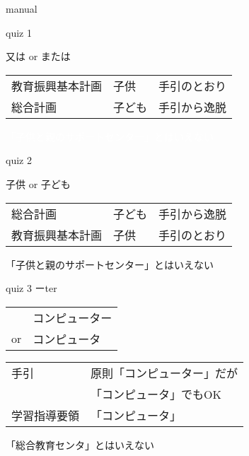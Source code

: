 \documentclass[
  ignorenonframetext,
  aspectratio=169]{beamer}
\begin{document}
\begin{frame}{manual}
\protect\hypertarget{manual}{}
\vspace*{-20pt}
\end{frame}

\begin{frame}{quiz 1}
\protect\hypertarget{quiz-1}{}
\Huge

又は or または

\bigskip

\large

\raggedleft
\textcolor{white}{\begin{tabular}{@{}lll@{}}\toprule
教育振興基本計画&子供&手引のとおり\\
総合計画&子ども&手引から逸脱\\\bottomrule
\end{tabular}}

\vfill

\textcolor{white}{「子供と親のサポートセンター」とはいえない}
\end{frame}

\begin{frame}{quiz 2}
\protect\hypertarget{quiz-2}{}
\Huge

子供 or 子ども \pause

\bigskip

\large

\raggedleft
\begin{tabular}{@{}lll@{}}\toprule
総合計画&子ども&手引から逸脱\\\pause
教育振興基本計画&子供&手引のとおり\\
\bottomrule
\end{tabular}
\pause

\vfill

「子供と親のサポートセンター」とはいえない
\end{frame}

\begin{frame}{quiz 3 ーter}
\protect\hypertarget{quiz-3-ux30fcter}{}
\Huge

\begin{tabular}{@{}ll@{}}
&コンピューター\\
or&コンピュータ
\end{tabular}

\pause

\vfill

\large
\raggedleft
\begin{tabular}{@{}ll@{}}\toprule
手引&原則「コンピューター」だが\\
&「コンピュータ」でもOK\\\pause
学習指導要領&「コンピュータ」\\\bottomrule
\end{tabular}
\pause

\vfill

「総合教育センタ」とはいえない
\end{frame}
\end{document}
